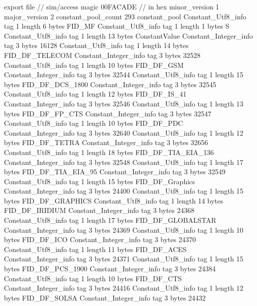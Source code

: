 export file {		// sim/access
	magic	00FACADE		 // in hex
	minor_version	1
	major_version	2
	constant_pool_count	293
	constant_pool {
		Constant_Utf8_info {
			tag	1
			length	6
			bytes	FID_MF
		}
		Constant_Utf8_info {
			tag	1
			length	1
			bytes	S
		}
		Constant_Utf8_info {
			tag	1
			length	13
			bytes	ConstantValue
		}
		Constant_Integer_info {
			tag	3
			bytes	16128
		}
		Constant_Utf8_info {
			tag	1
			length	14
			bytes	FID_DF_TELECOM
		}
		Constant_Integer_info {
			tag	3
			bytes	32528
		}
		Constant_Utf8_info {
			tag	1
			length	10
			bytes	FID_DF_GSM
		}
		Constant_Integer_info {
			tag	3
			bytes	32544
		}
		Constant_Utf8_info {
			tag	1
			length	15
			bytes	FID_DF_DCS_1800
		}
		Constant_Integer_info {
			tag	3
			bytes	32545
		}
		Constant_Utf8_info {
			tag	1
			length	12
			bytes	FID_DF_IS_41
		}
		Constant_Integer_info {
			tag	3
			bytes	32546
		}
		Constant_Utf8_info {
			tag	1
			length	13
			bytes	FID_DF_FP_CTS
		}
		Constant_Integer_info {
			tag	3
			bytes	32547
		}
		Constant_Utf8_info {
			tag	1
			length	10
			bytes	FID_DF_PDC
		}
		Constant_Integer_info {
			tag	3
			bytes	32640
		}
		Constant_Utf8_info {
			tag	1
			length	12
			bytes	FID_DF_TETRA
		}
		Constant_Integer_info {
			tag	3
			bytes	32656
		}
		Constant_Utf8_info {
			tag	1
			length	18
			bytes	FID_DF_TIA_EIA_136
		}
		Constant_Integer_info {
			tag	3
			bytes	32548
		}
		Constant_Utf8_info {
			tag	1
			length	17
			bytes	FID_DF_TIA_EIA_95
		}
		Constant_Integer_info {
			tag	3
			bytes	32549
		}
		Constant_Utf8_info {
			tag	1
			length	15
			bytes	FID_DF_Graphics
		}
		Constant_Integer_info {
			tag	3
			bytes	24400
		}
		Constant_Utf8_info {
			tag	1
			length	15
			bytes	FID_DF_GRAPHICS
		}
		Constant_Utf8_info {
			tag	1
			length	14
			bytes	FID_DF_IRIDIUM
		}
		Constant_Integer_info {
			tag	3
			bytes	24368
		}
		Constant_Utf8_info {
			tag	1
			length	17
			bytes	FID_DF_GLOBALSTAR
		}
		Constant_Integer_info {
			tag	3
			bytes	24369
		}
		Constant_Utf8_info {
			tag	1
			length	10
			bytes	FID_DF_ICO
		}
		Constant_Integer_info {
			tag	3
			bytes	24370
		}
		Constant_Utf8_info {
			tag	1
			length	11
			bytes	FID_DF_ACES
		}
		Constant_Integer_info {
			tag	3
			bytes	24371
		}
		Constant_Utf8_info {
			tag	1
			length	15
			bytes	FID_DF_PCS_1900
		}
		Constant_Integer_info {
			tag	3
			bytes	24384
		}
		Constant_Utf8_info {
			tag	1
			length	10
			bytes	FID_DF_CTS
		}
		Constant_Integer_info {
			tag	3
			bytes	24416
		}
		Constant_Utf8_info {
			tag	1
			length	12
			bytes	FID_DF_SOLSA
		}
		Constant_Integer_info {
			tag	3
			bytes	24432
		}
}}
